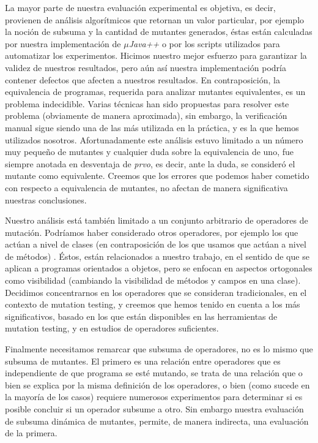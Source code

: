 La mayor parte de nuestra evaluaci\'on experimental es objetiva, es decir, provienen de an\'alisis algor\'itmicos  que retornan un valor particular, por ejemplo la noci\'on de subsuma y la cantidad de mutantes generados, \'estas est\'an calculadas por nuestra implementaci\'on de \emph{$\mu$Java++} o por los scripts utilizados para automatizar los experimentos. Hicimos nuestro mejor esfuerzo para garantizar la validez de nuestros resultados, pero a\'un as\'i nuestra implementaci\'on podr\'ia contener defectos que afecten a nuestros resultados. En contraposici\'on, la equivalencia de programas, requerida para analizar mutantes equivalentes, es un problema indecidible. Varias t\'ecnicas han sido propuestas para resolver este problema (obviamente de manera aproximada), sin embargo, la verificaci\'on manual sigue siendo una de las m\'as utilizada en la pr\'actica, y es la que hemos utilizados nosotros. Afortunadamente este an\'alisis estuvo limitado a un n\'umero muy peque\~no de mutantes y cualquier duda sobre la equivalencia de uno, fue siempre anotada en desventaja de \emph{prvo}, es decir, ante la duda, se consider\'o el mutante como equivalente. Creemos que los errores que podemos haber cometido con respecto a equivalencia de mutantes, no afectan de manera significativa nuestras conclusiones.

Nuestro an\'alisis est\'a tambi\'en limitado a un conjunto arbitrario de operadores de mutaci\'on. Podr\'iamos haber considerado otros operadores, por ejemplo los que act\'uan a nivel de clases (en contraposici\'on de los que usamos que act\'uan a nivel de m\'etodos) \cite{bibliography.mutation.class-level-ops}. \'Estos, est\'an relacionados a nuestro trabajo, en el sentido de que se aplican a programas orientados a objetos, pero se enfocan en aspectos ortogonales como visibilidad (cambiando la visibilidad de m\'etodos y campos en una clase). Decidimos concentrarnos en los operadores que se consideran tradicionales, en el contexto de mutation testing, y creemos que hemos tenido en cuenta a los m\'as significativos, basado en los que est\'an disponibles en las herramientas de mutation testing, y en estudios de operadores suficientes.

Finalmente necesitamos remarcar que subsuma de operadores, no es lo mismo que subsuma de mutantes. El primero es una relaci\'on entre operadores que es independiente de que programa se est\'e mutando, se trata de una relaci\'on que o bien se explica por la misma definici\'on de los operadores, o bien (como sucede en la mayor\'ia de los casos) requiere numerosos experimentos para determinar si es posible concluir si un operador subsume a otro. Sin embargo nuestra evaluaci\'on de subsuma din\'amica de mutantes, permite, de manera indirecta, una evaluaci\'on de la primera.

